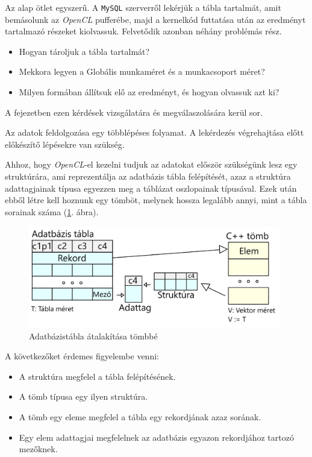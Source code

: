 
Az alap ötlet egyszerű. A \texttt{MySQL} szerverről lekérjük a tábla tartalmát, amit bemásolunk az \textit{OpenCL} pufferébe, majd a kernelkód futtatása után az eredményt tartalmazó részeket kiolvassuk. Felvetődik azonban néhány problémás rész.
\begin{itemize}
	\item Hogyan tároljuk a tábla tartalmát?
	\item Mekkora legyen a Globális munkaméret és a munkacsoport méret?
	\item Milyen formában állítsuk elő az eredményt, és hogyan olvassuk azt ki?
\end{itemize}
A fejezetben ezen kérdések vizsgálatára és megválaszolására kerül sor.


Az adatok feldolgozása egy többlépéses folyamat. A lekérdezés végrehajtása előtt előkészítő lépésekre van szükség.


Ahhoz, hogy \textit{OpenCL}-el kezelni tudjuk az adatokat először szükségünk lesz egy struktúrára, ami reprezentálja az adatbázis tábla felépítését, azaz a struktúra adattagjainak típusa egyezzen meg a táblázat oszlopainak típusával. Ezek után ebből létre kell hoznunk egy tömböt, melynek hossza legalább annyi, mint a tábla sorainak száma (\ref{fig:structure}. ábra).

\begin{figure}[h!]
\centering
\includegraphics[width=11cm]{images/data/structure.png}
\caption{Adatbázistábla átalakítása tömbbé}
\label{fig:structure}
\end{figure}

A következőket érdemes figyelembe venni:
\begin{itemize}
\item A struktúra megfelel a tábla felépítésének.
\item A tömb típusa egy ilyen struktúra.
\item A tömb egy eleme megfelel a tábla egy rekordjának azaz sorának.
\item Egy elem adattagjai megfelelnek az adatbázis egyazon rekordjához tartozó mezőknek.
\end{itemize}


